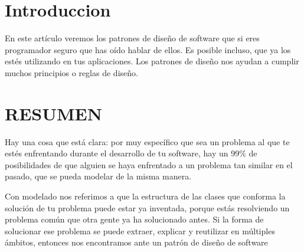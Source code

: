 \documentclass[12pt]{article}
\begin{document}
\vspace{\baselineskip}

\vspace{\baselineskip}

\vspace{\baselineskip}
\begin{multicols}{2}
\section{Introduccion}
{\fontsize{9pt}{10.8pt}\selectfont En este artículo veremos los patrones de diseño de software que si eres programador seguro que has oído hablar de ellos. Es posible incluso, que ya los estés utilizando en tus aplicaciones. Los patrones de diseño nos ayudan a cumplir muchos principios o reglas de diseño.\par}\par


\vspace{\baselineskip}

\vspace{\baselineskip}
\section{RESUMEN}
{\fontsize{9pt}{10.8pt}\selectfont Hay una cosa que está clara: por muy específico que sea un problema al que te estés enfrentando durante el desarrollo de tu software, hay un 99$\%$  de posibilidades de que alguien se haya enfrentado a un problema tan similar en el pasado, que se pueda modelar de la misma manera. \par}\par


\vspace{\baselineskip}
{\fontsize{9pt}{10.8pt}\selectfont  \par}\par


\vspace{\baselineskip}
{\fontsize{9pt}{10.8pt}\selectfont Con modelado nos referimos a que la estructura de las clases que conforma la solución de tu problema puede estar ya inventada, porque estás resolviendo un problema común que otra gente ya ha solucionado antes. Si la forma de solucionar ese problema se puede extraer, explicar y reutilizar en múltiples ámbitos, entonces nos encontramos ante un patrón de diseño de software\par}\par


\vspace{\baselineskip}

\end{multicols}
\end{document}
